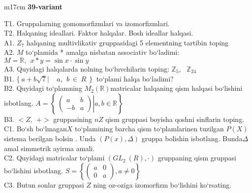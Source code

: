 \documentclass{article}
\begin{document}
\begin{tabular}{m{17cm}}
\textbf{39-variant}
\newline

T1. Gruppalarning gomomorfizmlari va izomorfizmlari. \\
T2. Halqaning ideallari. Faktor halqalar. Bosh ideallar halqasi. \\
A1. \(Z_{7}\) halqaning multivlikativ gruppasidagi 5 elementning tartibin toping \\
A2. \(M\) to`plamida * amalga nisbatan associativ bo`ladimi: \(M\mathbb{= R},\ \ x*y = \sin x \cdot \sin y\) \\
A3. Quyidagi halqalarda nolning bo`luvchilarin toping: \(\mathbb{Z}_{5},\ \ \ \mathbb{Z}_{24}\) \\
B1. \(\{\ a + b\sqrt{7}\left| \ \ \ \ \ a,\ \ b\  \in \ R\ \ \} \right.\ \) to`plami halqa bo`ladimi? \\
B2. Quyidagi to`plamning \(M_{2}(\mathbb{R})\)matricalar halqaning qism halqasi bo`lishini isbotlang. \(A = \left\{ \left. \ \begin{pmatrix}
a & b \\
 - b & a
\end{pmatrix} \right|a,b\mathbb{\in R} \right\}\) \\
B3. \(< Z,\ \  + >\) gruppasining \(nZ\) qism gruppasi boyisha qo\textquotesingle shni sinflarin toping. \\
C1. Bo`sh bo`lmagan\(X\) to`plamining barcha qism to`plamlarinen tuzilgan \(P(X)\) sistema berilgan bo\textquotesingle lsin . Unda \((P(x),\Delta)\) gruppa bolishin isbotlang. Bunda\(\Delta\) amal simmetrik ayirma amali. \\
C2. Quyidagi matricalar to`plami \((GL_{2}^{\ }\ (R), \cdot )\) gruppaning qism gruppasi bo`lishini isbotlang. \(S = \left\{ \begin{pmatrix}
a & 0 \\
0 & a
\end{pmatrix},a \neq 0 \right\}\) \\
C3. Butun sonlar gruppasi \(Z\) ning o\textquotesingle z-o\textquotesingle ziga izomorfizm bo`lishini ko`rsating. \\

\end{tabular}
\vspace{1cm}
\end{document}
